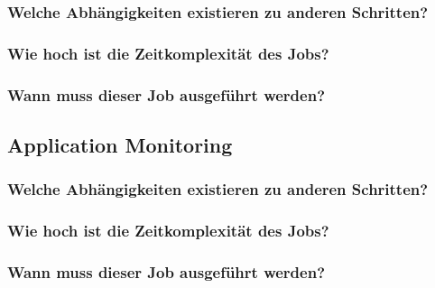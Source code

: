 \subsubsection{Welche Abhängigkeiten existieren zu anderen Schritten?}
\subsubsection{Wie hoch ist die Zeitkomplexität des Jobs?}
\subsubsection{Wann muss dieser Job ausgeführt werden?}

\subsection{Application Monitoring}
\subsubsection{Welche Abhängigkeiten existieren zu anderen Schritten?}
\subsubsection{Wie hoch ist die Zeitkomplexität des Jobs?}
\subsubsection{Wann muss dieser Job ausgeführt werden?}
